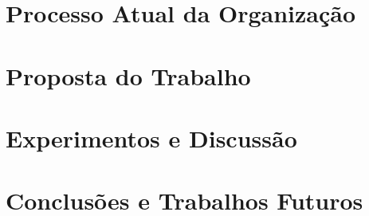 \documentclass[
    12pt,       %
    openright,      %
    twoside,      %
    a4paper,      %
    english,      %
    french,       %
    spanish,      %
    brazil,       %
    ]{abntex2}
\begin{document}
\chapter{Processo Atual da Organização}
\label{sec:Processo}


\chapter{Proposta do Trabalho}
\label{sec:Proposta}


\chapter{Experimentos e Discussão}
\label{sec:Experimentos}


\chapter{Conclusões e Trabalhos Futuros}
\label{sec:Conclusoes}


  \postextual


  
  

\end{document}
